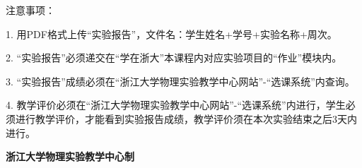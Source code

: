 \documentclass[10pt,a4paper]{ctexart} %
\begin{document}
\vspace*{\fill} %
\noindent
\begin{minipage}{\textwidth}
  注意事项：

  \begingroup
    \setlength{\leftskip}{2em} %
    1. 用PDF格式上传“实验报告”，文件名：学生姓名+学号+实验名称+周次。

    2. “实验报告”必须递交在“学在浙大”本课程内对应实验项目的“作业”模块内。

    3. “实验报告”成绩必须在“浙江大学物理实验教学中心网站”-“选课系统”内查询。

    4. 教学评价必须在“浙江大学物理实验教学中心网站”-“选课系统”内进行，学生必须进行教学评价，才能看到实验报告成绩，教学评价须在本次实验结束之后3天内进行。\par
  \endgroup

  \begin{center}
    {\bfseries 浙江大学物理实验教学中心制}
  \end{center}
\end{minipage}
\end{document}
